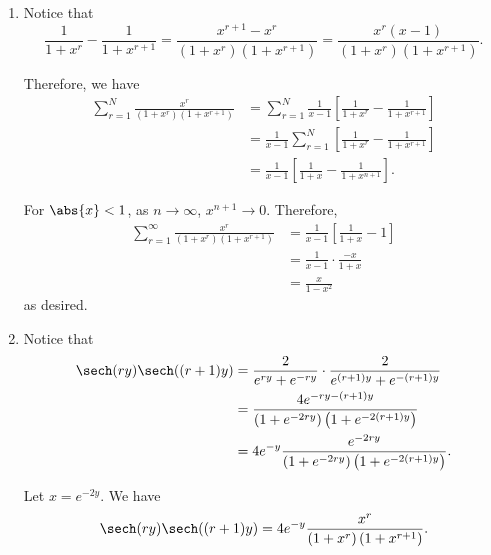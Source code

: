 \Question{\currfilebase}

\begin{enumerate}
    \item Notice that
          \[
              \frac{1}{1 + x^r} - \frac{1}{1 + x^{r + 1}} = \frac{x^{r + 1} - x^r}{(1 + x^r)(1 + x^{r + 1})} = \frac{x^r (x - 1)}{(1 + x^r)(1 + x^{r + 1})}.
          \]

          Therefore, we have
          \begin{align*}
              \sum_{r = 1}^{N} \frac{x^r}{(1 + x^r)(1 + x^{r + 1})} & = \sum_{r = 1}^{N} \frac{1}{x - 1} \left[\frac{1}{1 + x^r} - \frac{1}{1 + x^{r + 1}}\right] \\
                                                                    & = \frac{1}{x - 1} \sum_{r = 1}^{N}\left[\frac{1}{1 + x^r} - \frac{1}{1 + x^{r + 1}}\right]  \\
                                                                    & = \frac{1}{x - 1} \left[\frac{1}{1 + x} - \frac{1}{1 + x^{n + 1}}\right].
          \end{align*}

          For \(\abs{x} < 1\), as \(n \to \infty\), \(x^{n + 1} \to 0\). Therefore,
          \begin{align*}
              \sum_{r = 1}^{\infty} \frac{x^r}{(1 + x^r)(1 + x^{r + 1})} & = \frac{1}{x - 1} \left[\frac{1}{1 + x} - 1\right] \\
                                                                         & = \frac{1}{x - 1} \cdot \frac{-x}{1 + x}           \\
                                                                         & = \frac{x}{1 - x^2}
          \end{align*}
          as desired.

    \item Notice that
          \begin{align*}
              \sech (ry) \sech((r + 1)y) & = \frac{2}{e^{ry} + e^{-ry}} \cdot \frac{2}{e^{(r + 1)y} + e^{-(r + 1)y}}             \\
                                         & = \frac{4e^{-ry - (r + 1)y}}{\left(1 + e^{-2ry}\right) \left(1 + e^{-2(r+1)y}\right)} \\
                                         & = 4 e^{-y} \frac{e^{-2ry}}{\left(1 + e^{-2ry}\right) \left(1 + e^{-2(r+1)y}\right)}.
          \end{align*}

          Let \(x = e^{-2y}\). We have
          \[
              \sech (ry) \sech((r + 1)y) = 4e^{-y} \frac{x^r}{\left(1 + x^r\right)\left(1 + x^{r + 1}\right)}.
          \]


\end{enumerate}
